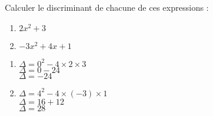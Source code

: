 \documentclass[a4paper,11pt,exos]{nsi} %
\begin{document}

\maketitle

\begin{exercice}
    Calculer le discriminant de chacune de ces expressions :
    \begin{multicols}{2}
        \begin{enumerate}
            \item $2x^2+3$
        
            \item $-3x^2+4x+1$
        \end{enumerate}
    \end{multicols}
    
\end{exercice}

    \begin{multicols}{2}
        \begin{enumerate}
            \item$\Delta = 0^2-4\times2\times3$\\
                $\Delta = 0-24$\\
                $\Delta=-24$
        
            \item $\Delta =4^2-4\times\left(-3\right)\times1$\\
            $\Delta=16+12$\\
            $\Delta=28$
        \end{enumerate}
    \end{multicols}
\end{document}
